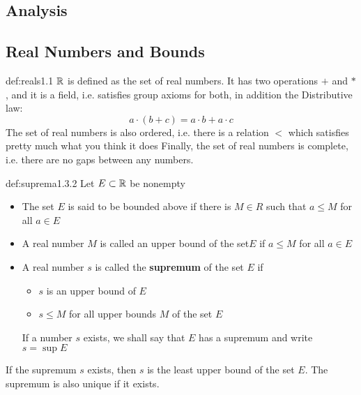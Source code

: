 \documentclass[landscape, 8pt]{extarticle}
\begin{document}
\begin{multicols}{3}

\section{\huge Analysis}
\subsection*{Real Numbers and Bounds}
\begin{dfn}{def:reals}{1.1}
$\mathbb{R}$ is defined as the set of real numbers. It has two operations $+$ and $\ast$, and it is a field, i.e. satisfies group axioms for both, in addition the Distributive law:
\[a\cdot(b+c) = a\cdot b + a\cdot c\]
\vspace{0pt}\newline
The set of real numbers is also ordered, i.e. there is a relation $<$ which satisfies pretty much what you think it does
\vspace{0pt}\newline
Finally, the set of real numbers is complete, i.e. there are no gaps between any numbers.
\end{dfn}
\vspace{-5pt}

\begin{dfn}{def:suprema}{1.3.2}
Let $E \subset \mathbb{R}$ be nonempty
\vspace{-5pt}
\renewcommand\labelitemi{\tiny$\bullet$}
\begin{itemize}
    \setlength\itemsep{0em}
    \item The set $E$ is said to be bounded above if there is $M\in R$ such that $a\le M$ for all $a\in E$
    \item A real number $M$ is called an upper bound of the set$E$ if $a\le M$ for all $a\in E$
    \item A real number $s$ is called the \textbf{supremum} of the set $E$ if 
    \vspace{-5pt}
    \renewcommand\labelitemi{\tiny$\bullet$}
    \begin{itemize}
        \setlength\itemsep{0em}
        \item $s$ is an upper bound of $E$
        \item $s\le M$ for all upper bounds $M$ of the set $E$
    \end{itemize}
    If a number $s$ exists, we shall say that $E$ has a supremum and write $s=\sup E$
\end{itemize}
If the supremum $s$ exists, then $s$ is the least upper bound of the set $E$. The supremum is also unique if it exists.
\end{dfn}
\vspace{-5pt}


\end{multicols}
\end{document}
